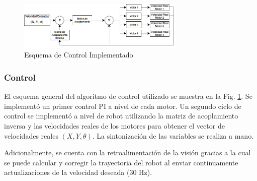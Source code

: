 \documentclass[twocolumn,10pt]{amrob}
\begin{document}

\begin{figure}
  \centering
    \includegraphics[width=8cm]{ciclo_ctrl_avr.png}
  \caption{Esquema de Control Implementado}
  \label{fig:ctrl}
\end{figure}
\subsubsection*{Control}
\label{subsec:algoritmos-ctrl}
El esquema general del algoritmo de control utilizado se muestra en la Fig. \ref{fig:ctrl}. Se implementó un primer control PI a nivel de cada motor. Un segundo ciclo de control se implementó a nivel de robot utilizando la matriz de acoplamiento inversa y las velocidades reales de los motores para obtener el vector de velocidades reales $(X, Y, \theta)$.   La sintonización de las variables se realiza a mano. \par
Adicionalmente, se cuenta con la retroalimentación de la visión gracias a la cual se puede calcular y corregir la trayectoria del robot al enviar continuamente actualizaciones de la velocidad deseada (30 Hz). 
\end{document}
